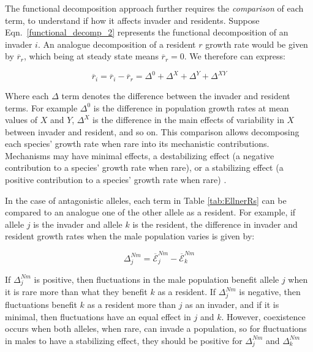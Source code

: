 \documentclass[]{article}
\begin{document}
The functional decomposition approach further requires the \textit{comparison} of each term, to understand if how it affects invader and residents. Suppose Eqn.~\ref{functional_decomp_2} represents the functional  decomposition of an invader $i$. An analogue decomposition of a resident $r$ growth rate would be given by $\overline{r}_{r}$, which being at steady state means $\overline{r}_{r}=0$. We therefore can express:


\begin{equation}
    \overline{r}_{i}= \overline{r}_{i} - \overline{r}_{r} = \Delta^{0} + \Delta^{X}+  \Delta^{Y}+ \Delta^{XY}
   \label{functional_decomp_3}
\end{equation}

Where each $\Delta$ term denotes the difference between the invader and resident terms. For example $\Delta^{0}$  is the difference in population growth rates at mean values of $X$ and $Y$, $\Delta^{X}$ is the difference in the main effects of variability in $X$ between invader and resident, and so on. This comparison allows decomposing each species' growth rate when rare into its mechanistic contributions. Mechanisms may have minimal effects, a destabilizing effect (a negative contribution to a species' growth rate when rare), or a stabilizing effect (a positive contribution to a species' growth rate when rare) \citep{shoemaker2020}.

In the case of antagonistic alleles, each term in Table \ref{tab:EllnerRs} can be compared to an analogue one of the other allele as a resident. For example, if allele $j$ is the invader and allele $k$ is the resident, the difference in invader and resident growth rates when the male population varies is given by:


\begin{equation}
\Delta^{Nm}_{j}= \overline{\mathcal{E}}^{Nm}_{j} - \overline{\mathcal{E}}^{Nm}_{k}
\label{delta}
\end{equation}

If $\Delta^{Nm}_{j}$ is positive, then fluctuations in the male population benefit allele $j$ when it is rare more than what they benefit $k$ as a resident. If $\Delta^{Nm}_{j}$ is negative, then fluctuations benefit $k$ as a resident more than $j$ as an invader, and if it is minimal, then fluctuations have an equal effect in $j$ and $k$. However, coexistence occurs when both alleles, when rare, can invade a population, so for fluctuations in males to have a stabilizing effect, they should be positive for $\Delta^{Nm}_{j}$ and $\Delta^{Nm}_{k}$
\end{document}

